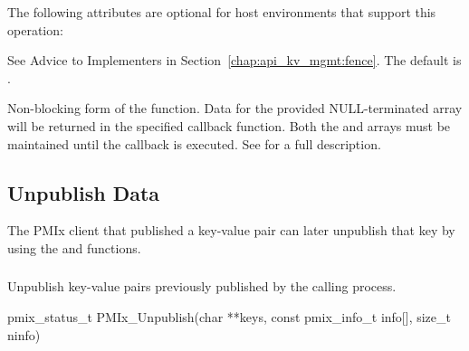 \optattrstart
The following attributes are optional for host environments that support this operation:

See Advice to Implementers in Section~\ref{chap:api_kv_mgmt:fence}.
\pastePRIAttributeItemEnd
{}
The default is .
\pastePRIAttributeItemEnd
{}

\optattrend


\descr

Non-blocking form of the  function.
Data for the provided NULL-terminated  array will be returned in the specified  callback function.
Both the  and  arrays must be maintained until the callback is executed.
See  for a full description.


\subsection{Unpublish Data}
\label{chap:api_kv_mgmt:unpublish}

The \ac{PMIx} client that published a key-value pair can later unpublish that key by using the  and  functions.


\subsubsection{}

\summary

Unpublish key-value pairs previously published by the calling process.

\format

\cspecificstart
\begin{codepar}
pmix_status_t
PMIx_Unpublish(char **keys,
               const pmix_info_t info[], size_t ninfo)
\end{codepar}
\cspecificend

\begin{arglist}
\end{arglist}

